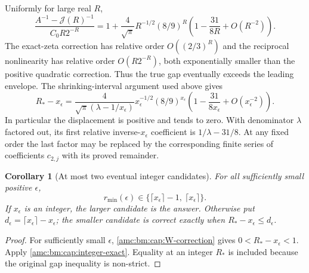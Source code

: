 \documentclass[11pt,letterpaper]{article}
\newtheorem{corollary}[theorem]{Corollary}
\theoremstyle{remark}\newtheorem{remark}[theorem]{Remark}
\begin{document}
Uniformly for large real $R$,
\[
 \frac{A^{-1}-\mathcal J(R)^{-1}}{C_0R2^{-R}}
 =1+\frac4{\sqrt\pi}R^{-1/2}(8/9)^R
 \left(1-\frac{31}{8R}+O(R^{-2})\right).
\]
The exact-zeta correction has relative order $O((2/3)^R)$ and the reciprocal nonlinearity has relative order $O(R2^{-R})$, both exponentially smaller than the positive quadratic correction. Thus the true gap eventually exceeds the leading envelope. The shrinking-interval argument used above gives
\begin{equation}\label{amc:bm:cap:W-correction}
 R_*-x_\epsilon=
 \frac4{\sqrt\pi(\lambda-1/x_\epsilon)}x_\epsilon^{-1/2}
 (8/9)^{x_\epsilon}
 \left(1-\frac{31}{8x_\epsilon}+O(x_\epsilon^{-2})\right).
\end{equation}
In particular the displacement is positive and tends to zero. With denominator $\lambda$ factored out, its first relative inverse-$x_\epsilon$ coefficient is $1/\lambda-31/8$. At any fixed order the last factor may be replaced by the corresponding finite series of coefficients $c_{2,j}$ with its proved remainder.

\begin{corollary}[At most two eventual integer candidates]\label{amc:bm:cap:two-candidates}
For all sufficiently small positive $\epsilon$,
\begin{equation}\label{amc:bm:cap:two-integers}
 r_{\min}(\epsilon)\in
 \{\lceil x_\epsilon\rceil-1,\ \lceil x_\epsilon\rceil\}.
\end{equation}
If $x_\epsilon$ is an integer, the larger candidate is the answer. Otherwise put $d_\epsilon=\lceil x_\epsilon\rceil-x_\epsilon$; the smaller candidate is correct exactly when $R_*-x_\epsilon\le d_\epsilon$.
\end{corollary}
\begin{proof}
For sufficiently small $\epsilon$, \eqref{amc:bm:cap:W-correction} gives
$0<R_*-x_\epsilon<1$. Apply \eqref{amc:bm:cap:integer-exact}. Equality at an integer $R_*$ is included because the original gap inequality is non-strict.
\end{proof}
\end{document}
